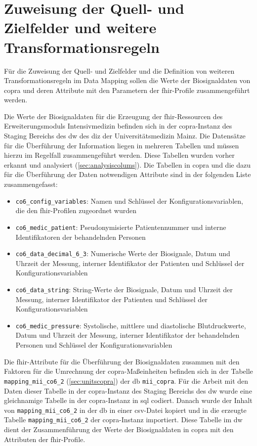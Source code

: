 \section{Zuweisung der Quell- und Zielfelder und weitere Transformationsregeln} \label{sec:transfer}

Für die Zuweisung der Quell- und Zielfelder und die Definition von weiteren Transformationsregeln im Data Mapping sollen die Werte der Biosignaldaten von \ac{copra} und deren Attribute mit den Parametern der \ac{fhir}-Profile zusammengeführt werden.

Die Werte der Biosignaldaten für die Erzeugung der \ac{fhir}-Ressourcen des Erweiterungsmoduls \glqq Intensivmedizin\grqq{} befinden sich in der \ac{copra}-Instanz des Staging Bereichs des \ac{dw} des \ac{diz} der Universitätsmedizin Mainz. Die Datensätze für die Überführung der Information liegen in mehreren Tabellen und müssen hierzu im Regelfall zusammengeführt werden. Diese Tabellen wurden vorher erkannt und analysiert (\ref{sec:analysiscolums}). Die Tabellen in \ac{copra} und die dazu für die Überführung der Daten notwendigen Attribute sind in der folgenden Liste zusammengefasst:
\begin{itemize}
  \item \texttt{co6\_config\_variables}: Namen und Schlüssel der Konfigurationsvariablen, die den \ac{fhir}-Profilen zugeordnet wurden
  \item \texttt{co6\_medic\_patient}: Pseudonymisierte Patientennummer und interne Identifikatoren der behandelnden Personen
  \item \texttt{co6\_data\_decimal\_6\_3}: Numerische Werte der Biosignale, Datum und Uhrzeit der Messung, interner Identifikator der Patienten und Schlüssel der Konfigurationsvariablen
  \item \texttt{co6\_data\_string}: String-Werte der Biosignale, Datum und Uhrzeit der Messung, interner Identifikator der Patienten und Schlüssel der Konfigurationsvariablen
  \item \texttt{co6\_medic\_pressure}: Systolische, mittlere und diastolische Blutdruckwerte, Datum und Uhrzeit der Messung, interner Identifikator der behandelnden Personen und Schlüssel der Konfigurationsvariablen
\end{itemize}

Die \ac{fhir}-Attribute für die Überführung der Biosignaldaten zusammen mit den Faktoren für die Umrechnung der \ac{copra}-Maßeinheiten befinden sich in der Tabelle \texttt{mapping\_mii\_co6\_2} (\ref{sec:unitscopra}) der \ac{db} \texttt{mii\_copra}. Für die Arbeit mit den Daten dieser Tabelle in der \ac{copra}-Instanz des Staging Bereichs des \ac{dw} wurde eine gleichnamige Tabelle in der \ac{copra}-Instanz in \ac{sql} codiert. Danach wurde der Inhalt von \texttt{mapping\_mii\_co6\_2} in der \ac{db} in einer \ac{csv}-Datei kopiert und in die erzeugte Tabelle \texttt{mapping\_mii\_co6\_2} der \ac{copra}-Instanz importiert. Diese Tabelle im \ac{dw} dient der Zusammenführung der Werte der Biosignaldaten in \ac{copra} mit den Attributen der \ac{fhir}-Profile.

